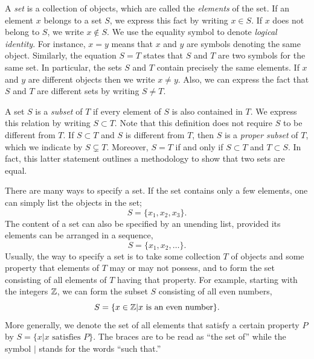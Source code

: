 A \emph{set} is a collection of objects, which are called the \emph{elements} of the set.
If an element $x$ belongs to a set $S$, we express this fact by writing $x \in S$.
If $x$ does not belong to $S$, we write $x \notin S$.
We use the equality symbol to denote \emph{logical identity}.
For instance, $x = y$ means that $x$ and $y$ are symbols denoting the same object.
Similarly, the equation $S = T$ states that $S$ and $T$ are two symbols for the same set.
In particular, the sets $S$ and $T$ contain precisely the same elements.
If $x$ and $y$ are different objects then we write $x \neq y$.
Also, we can express the fact that $S$ and $T$ are different sets by writing $S \neq T$.

A set $S$ is a \emph{subset} of $T$ if every element of $S$ is also contained in $T$.
We express this relation by writing $S \subset T$.
Note that this definition does not require $S$ to be different from $T$.
If $S \subset T$ and $S$ is different from $T$, then $S$ is a \emph{proper subset} of $T$, which we indicate by $S \subsetneq T$.
Moreover, $S = T$ if and only if $S \subset T$ and $T \subset S$.
In fact, this latter statement outlines a methodology to show that two sets are equal.

There are many ways to specify a set.
If the set contains only a few elements, one can simply list the objects in the set;
\begin{equation*}
S = \{ x_1, x_2, x_3 \} .
\end{equation*}
The content of a set can also be specified by an unending list, provided its elements can be arranged in a sequence,
\begin{equation*}
S = \{ x_1, x_2, \ldots \} .
\end{equation*}
Usually, the way to specify a set is to take some collection $T$ of objects and some property that elements of $T$ may or may not possess, and to form the set consisting of all elements of $T$ having that property.
For example, starting with the integers $\mathbb{Z}$, we can form the subset $S$ consisting of all even numbers,
\begin{equation*}
S = \{ x \in \mathbb{Z} | x \text{ is an even number} \}.
\end{equation*}
More generally, we denote the set of all elements that satisfy a certain property $P$ by $S = \{ x | x \text{ satisfies } P \}$.
The braces are to be read as ``the set of'' while the symbol $|$ stands for the words ``such that.''

